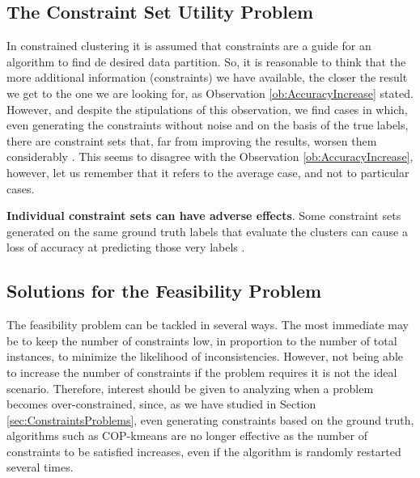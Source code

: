 \subsection{The Constraint Set Utility Problem} \label{sec:UtilityProblem}

In constrained clustering it is assumed that constraints are a guide for an algorithm to find de desired data partition. So, it is reasonable to think that the more additional information (constraints) we have available, the closer the result we get to the one we are looking for, as Observation \ref{ob:AccuracyIncrease} stated. However, and despite the stipulations of this observation, we find cases in which, even generating the constraints without noise and on the basis of the true labels, there are constraint sets that, far from improving the results, worsen them considerably \cite{davidson2006proceedings}. This seems to disagree with the Observation \ref{ob:AccuracyIncrease}, however, let us remember that it refers to the average case, and not to particular cases.

\begin{observation}
	
	\textbf{Individual constraint sets can have adverse effects}. Some constraint sets generated on the same ground truth labels that evaluate the clusters can cause a loss of accuracy at predicting those very labels \cite{davidson2007survey}.
	
\end{observation}

\subsection{Solutions for the Feasibility Problem} \label{sec:FeasibilityProblemSolutions}

The feasibility problem can be tackled in several ways. The most immediate may be to keep the number of constraints low, in proportion to the number of total instances, to minimize the likelihood of inconsistencies. However, not being able to increase the number of constraints if the problem requires it is not the ideal scenario. Therefore, interest should be given to analyzing when a problem becomes over-constrained, since, as we have studied in Section \ref{sec:ConstraintsProblems}, even generating constraints based on the ground truth, algorithms such as COP-kmeans are no longer effective as the number of constraints to be satisfied increases, even if the algorithm is randomly restarted several times.

